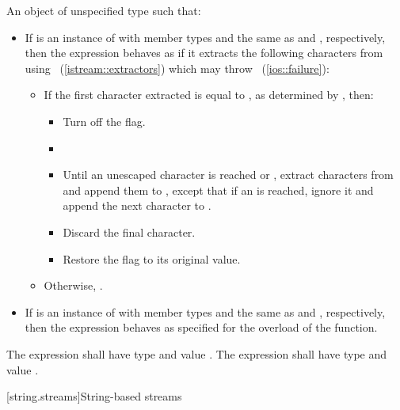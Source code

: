 \begin{itemdescr}
\pnum
\returns An object of unspecified type such that:
\begin{itemize}
\item If  is an instance of  with member types
 and  the same as 
and , respectively, then the expression
 behaves as if it extracts the following
characters from  using
~(\ref{istream::extractors})
which may throw \brk{}~(\ref{ios::failure}):
\begin{itemize}
\item If the first character extracted is equal to , as
determined by , then:
\begin{itemize}
\item Turn off the  flag.
\item {}
\item Until an unescaped  character is reached or ,
extract characters from  and append them to , except that
if an  is reached, ignore it and append the next character to
.
\item Discard the final  character.
\item Restore the  flag to its original value.
\end{itemize}
\item Otherwise, .
\end{itemize}
\item If  is an instance of  with member types
 and  the same as  and
, respectively, then the expression
 behaves as specified for the
 overload of the
 function.
\end{itemize}
The expression  shall have type
 and value . The expression
 shall have type
 and value .
\end{itemdescr}

[string.streams]{String-based streams}

